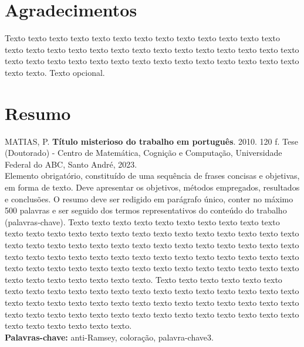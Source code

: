 \documentclass[12pt,a4paper]{book}
\begin{document}

\chapter*{Agradecimentos}
Texto texto texto texto texto texto texto texto texto texto texto texto texto
texto texto texto texto texto texto texto texto texto texto texto texto texto
texto texto texto texto texto texto texto texto texto texto texto texto texto
texto texto texto texto. Texto opcional.


\chapter*{Resumo}

\noindent MATIAS, P. \textbf{Título misterioso do trabalho em português}. 
2010. 120 f.
Tese (Doutorado) - Centro de Matemática, Cognição e Computação,
Universidade Federal do ABC, Santo André, 2023.
\\

Elemento obrigatório, constituído de uma sequência de frases concisas e
objetivas, em forma de texto.  Deve apresentar os objetivos, métodos empregados,
resultados e conclusões.  O resumo deve ser redigido em parágrafo único, conter
no máximo 500 palavras e ser seguido dos termos representativos do conteúdo do
trabalho (palavras-chave). 
Texto texto texto texto texto texto texto texto texto texto texto texto texto
texto texto texto texto texto texto texto texto texto texto texto texto texto
texto texto texto texto texto texto texto texto texto texto texto texto texto
texto texto texto texto texto texto texto texto texto texto texto texto texto
texto texto texto texto texto texto texto texto texto texto texto texto texto
texto texto texto texto texto texto texto texto.
Texto texto texto texto texto texto texto texto texto texto texto texto texto
texto texto texto texto texto texto texto texto texto texto texto texto texto
texto texto texto texto texto texto texto texto texto texto texto texto texto
texto texto texto texto texto texto texto texto texto texto texto texto texto
texto texto.
\\

\noindent \textbf{Palavras-chave:} anti-Ramsey, coloração, palavra-chave3.
\end{document}

